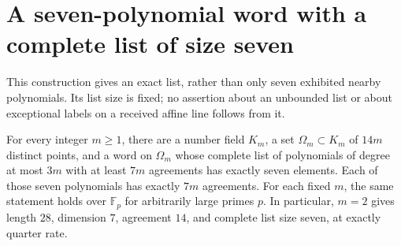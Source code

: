 \section{A seven-polynomial word with a complete list of size seven}
\label{app:seven-cubic-bank}

This construction gives an exact list, rather than only seven exhibited
nearby polynomials.  Its list size is fixed; no assertion about an unbounded
list or about exceptional labels on a received affine line follows from it.

\begin{theorem}\label{thm:seven-cubic-bank}
For every integer $m\geq1$, there are a number field $K_m$, a set
$\Omega_m\subset K_m$ of $14m$ distinct points, and a word on $\Omega_m$
whose complete list of polynomials of degree at most $3m$ with at least
$7m$ agreements has exactly seven elements.  Each of those seven
polynomials has exactly $7m$ agreements.  For each fixed $m$, the same
statement holds over $\mathbb F_p$ for arbitrarily large primes $p$.
In particular, $m=2$ gives length $28$, dimension $7$, agreement $14$,
and complete list size seven, at exactly quarter rate.
\end{theorem}

